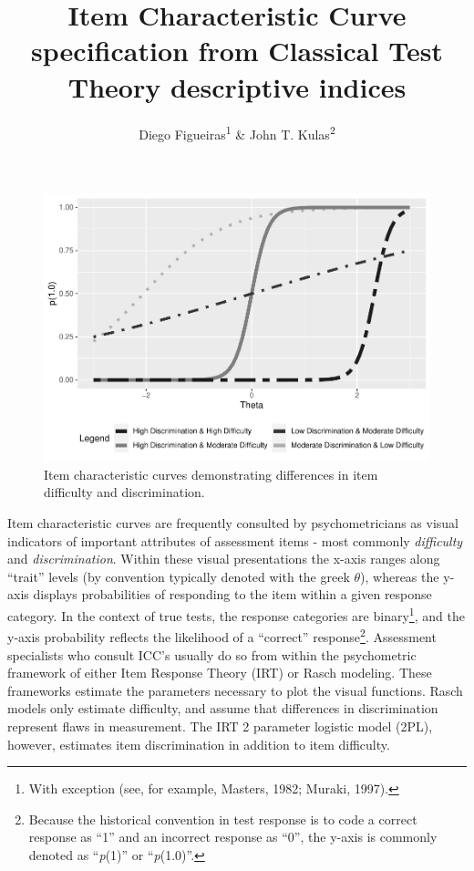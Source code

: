 \documentclass[
  jou]{apa6}
\title{Item Characteristic Curve specification from Classical Test Theory descriptive indices}
\author{Diego Figueiras\textsuperscript{1} \& John T. Kulas\textsuperscript{2}}
\date{}
\affiliation{\vspace{0.5cm}\textsuperscript{1} Montclair State University\\\textsuperscript{2} eRg}
\begin{document}
\maketitle

\begin{figure}
\includegraphics[width=1\linewidth,height=0.8\textheight]{ICC_project_files/figure-latex/example-1} \caption{Item characteristic curves demonstrating differences in item difficulty and discrimination.}\label{fig:example}
\end{figure}

Item characteristic curves are frequently consulted by psychometricians as visual indicators of important attributes of assessment items - most commonly \emph{difficulty} and \emph{discrimination}. Within these visual presentations the x-axis ranges along ``trait'' levels (by convention typically denoted with the greek \(\theta\)), whereas the y-axis displays probabilities of responding to the item within a given response category. In the context of true tests, the response categories are binary\footnote{With exception (see, for example, Masters, 1982; Muraki, 1997).}, and the y-axis probability reflects the likelihood of a ``correct'' response\footnote{Because the historical convention in test response is to code a correct response as ``1'' and an incorrect response as ``0'', the y-axis is commonly denoted as ``\emph{p}(1)'' or ``\emph{p}(1.0)''.}. Assessment specialists who consult ICC's usually do so from within the psychometric framework of either Item Response Theory (IRT) or Rasch modeling. These frameworks estimate the parameters necessary to plot the visual functions. Rasch models only estimate difficulty, and assume that differences in discrimination represent flaws in measurement. The IRT 2 parameter logistic model (2PL), however, estimates item discrimination in addition to item difficulty.
\end{document}
